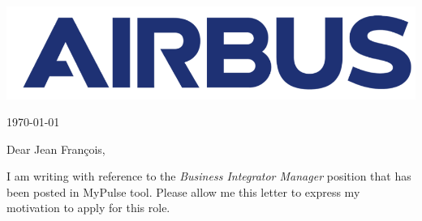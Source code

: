 \documentclass[11pt,a4paper]{letter}
\begin{document}
\thispagestyle{empty}

\vspace{15pt}

\begin{center}
\includegraphics[scale=0.1]{Images/airbus_blue_logo.png}
\end{center}
\vspace{30pt}

\hspace*{\fill} \longdate\today 


\vspace{15pt}



Dear Jean François,

\vspace{15pt}

I am writing with reference to the \textit{Business Integrator Manager} position that has been posted in MyPulse tool. Please allow me this letter to express my motivation to apply for this role.
\end{document}
